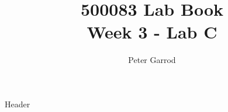 \documentclass{article}
\title{%
    500083 Lab Book \\
    \large Week 3 - Lab C
    }
\author{Peter Garrod}
\begin{document}
    \maketitle
    \tableofcontents
    \newpage

    {Header}
\end{document}

